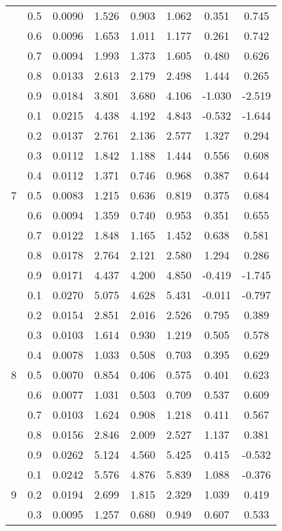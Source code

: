 \documentclass[11pt,a4paper]{report}
\begin{document}
\begin{longtable}{ | c | c || c | c | c | c | c | c | }
 & 0.5 & 0.0090 & 1.526 & 0.903 & 1.062 & 0.351 & 0.745 \\
 & 0.6 & 0.0096 & 1.653 & 1.011 & 1.177 & 0.261 & 0.742 \\
 & 0.7 & 0.0094 & 1.993 & 1.373 & 1.605 & 0.480 & 0.626 \\
 & 0.8 & 0.0133 & 2.613 & 2.179 & 2.498 & 1.444 & 0.265 \\
 & 0.9 & 0.0184 & 3.801 & 3.680 & 4.106 & -1.030 & -2.519 \\
 \hline
\multirow{9}{*}{7} & 0.1 & 0.0215 & 4.438 & 4.192 & 4.843 & -0.532 & -1.644 \\
 & 0.2 & 0.0137 & 2.761 & 2.136 & 2.577 & 1.327 & 0.294 \\
 & 0.3 & 0.0112 & 1.842 & 1.188 & 1.444 & 0.556 & 0.608 \\
 & 0.4 & 0.0112 & 1.371 & 0.746 & 0.968 & 0.387 & 0.644 \\
 & 0.5 & 0.0083 & 1.215 & 0.636 & 0.819 & 0.375 & 0.684 \\
 & 0.6 & 0.0094 & 1.359 & 0.740 & 0.953 & 0.351 & 0.655 \\
 & 0.7 & 0.0122 & 1.848 & 1.165 & 1.452 & 0.638 & 0.581 \\
 & 0.8 & 0.0178 & 2.764 & 2.121 & 2.580 & 1.294 & 0.286 \\
 & 0.9 & 0.0171 & 4.437 & 4.200 & 4.850 & -0.419 & -1.745 \\
 \hline
\multirow{9}{*}{8} & 0.1 & 0.0270 & 5.075 & 4.628 & 5.431 & -0.011 & -0.797 \\
 & 0.2 & 0.0154 & 2.851 & 2.016 & 2.526 & 0.795 & 0.389 \\
 & 0.3 & 0.0103 & 1.614 & 0.930 & 1.219 & 0.505 & 0.578 \\
 & 0.4 & 0.0078 & 1.033 & 0.508 & 0.703 & 0.395 & 0.629 \\
 & 0.5 & 0.0070 & 0.854 & 0.406 & 0.575 & 0.401 & 0.623 \\
 & 0.6 & 0.0077 & 1.031 & 0.503 & 0.709 & 0.537 & 0.609 \\
 & 0.7 & 0.0103 & 1.624 & 0.908 & 1.218 & 0.411 & 0.567 \\
 & 0.8 & 0.0156 & 2.846 & 2.009 & 2.527 & 1.137 & 0.381 \\
 & 0.9 & 0.0262 & 5.124 & 4.560 & 5.425 & 0.415 & -0.532 \\
 \hline
\multirow{9}{*}{9} & 0.1 & 0.0242 & 5.576 & 4.876 & 5.839 & 1.088 & -0.376 \\
 & 0.2 & 0.0194 & 2.699 & 1.815 & 2.329 & 1.039 & 0.419 \\
 & 0.3 & 0.0095 & 1.257 & 0.680 & 0.949 & 0.607 & 0.533 \\

\end{longtable}
\end{document}

